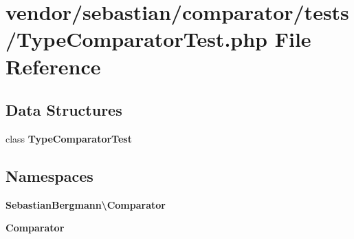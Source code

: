 \section{vendor/sebastian/comparator/tests/\+Type\+Comparator\+Test.php File Reference}
\label{_type_comparator_test_8php}
\subsection*{Data Structures}
\begin{DoxyCompactItemize}
\item 
class {\bf Type\+Comparator\+Test}
\end{DoxyCompactItemize}
\subsection*{Namespaces}
\begin{DoxyCompactItemize}
\item 
 {\bf Sebastian\+Bergmann\textbackslash{}\+Comparator}
\item 
 {\bf Comparator}
\end{DoxyCompactItemize}
